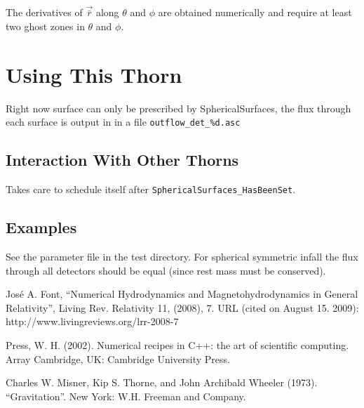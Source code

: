 The derivatives of $\vec{\bar r}$ along $\theta$ and $\phi$ are obtained
numerically and require at least two ghost zones in $\theta$ and $\phi$.

\section{Using This Thorn}
Right now surface can only be prescribed by SphericalSurfaces, the flux through
each surface is output in in a file \verb|outflow_det_%d.asc|

\subsection{Interaction With Other Thorns}
Takes care to schedule itself after \verb|SphericalSurfaces_HasBeenSet|.

\subsection{Examples}
See the parameter file in the test directory. For spherical symmetric infall
the flux through all detectors should be equal (since rest mass must be
conserved).

\begin{thebibliography}{9}
     Jos\'e A. Font,
    ``Numerical Hydrodynamics and Magnetohydrodynamics in General Relativity'',
    Living Rev. Relativity 11,  (2008),  7. URL (cited on August 15. 2009):
    http://www.livingreviews.org/lrr-2008-7

     Press, W. H. (2002). Numerical recipes in C++: the
        art of scientific computing. Array Cambridge, UK: Cambridge University
        Press. 

     Charles W. Misner, Kip S. Thorne, and John Archibald Wheeler (1973).
       ``Gravitation''. New York: W.H. Freeman and Company.
\end{thebibliography}



